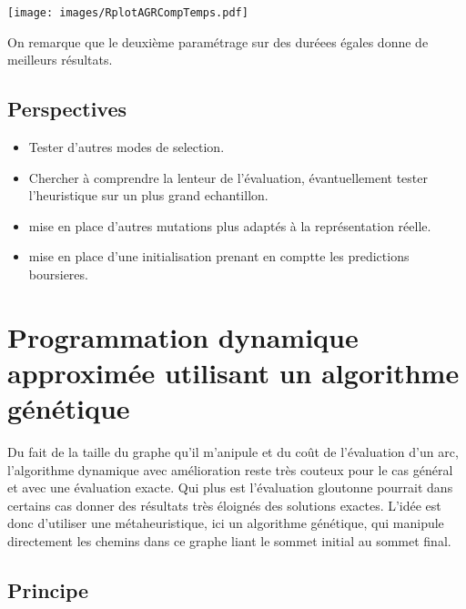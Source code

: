 \documentclass[a4paper]{report}
\begin{document}
\begin{center}
  \texttt{[image: images/RplotAGRCompTemps.pdf]}
\end{center} 
On remarque que le deuxième paramétrage sur des duréees égales donne de meilleurs résultats.
\subsection{Perspectives}
\begin{itemize}
\item Tester d'autres modes de selection.
\item Chercher à comprendre la lenteur de l'évaluation, évantuellement tester l'heuristique sur un plus grand echantillon.
\item mise en place d'autres mutations plus adaptés à la représentation réelle.
\item mise en place d'une initialisation prenant en comptte les predictions boursieres.\\

\end{itemize}

\section{Programmation dynamique approximée utilisant un algorithme génétique}
Du fait de la taille du graphe qu'il m'anipule et du coût de l'évaluation d'un arc, l'algorithme dynamique avec amélioration reste très couteux pour le cas général et avec une évaluation exacte. Qui plus est l'évaluation gloutonne pourrait dans certains cas donner des résultats très éloignés des solutions exactes.  L'idée est donc d'utiliser une métaheuristique, ici un algorithme génétique, qui manipule directement les chemins dans ce graphe liant le sommet initial au sommet final.\\

\subsection{Principe}
\end{document}
